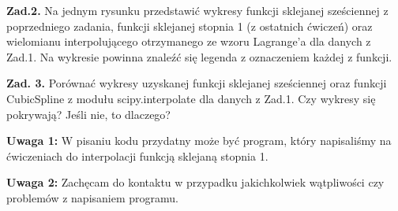 \documentclass[12pt]{report}
\begin{document}
\vspace{3mm}
\noindent
{\bf Zad.2.} Na jednym rysunku przedstawi\'c wykresy funkcji sklejanej sze\'sciennej z poprzedniego zadania, funkcji sklejanej stopnia 1 (z ostatnich \'cwicze\'n) oraz wielomianu interpoluj\k{a}cego otrzymanego ze wzoru Lagrange'a dla danych z Zad.1. Na wykresie powinna znale\'z\'c si\k{e} legenda z oznaczeniem ka\.zdej z funkcji. 

\vspace{3mm}
\noindent
{\bf Zad. 3.} Por\'owna\'c wykresy uzyskanej funkcji sklejanej sze\'sciennej oraz funkcji CubicSpline z modu\l{}u scipy.interpolate dla danych z Zad.1. Czy wykresy si\k{e} pokrywaj\k{a}? Je\'sli nie, to dlaczego?

\vspace{3mm}
\noindent
{\bf Uwaga 1:} W pisaniu kodu przydatny mo\.ze by\'c program, kt\'ory napisali\'smy na \'cwiczeniach do interpolacji funkcj\k{a} sklejan\k{a} stopnia 1.

\noindent
{\bf Uwaga 2:} Zach\k{e}cam do kontaktu w przypadku jakichkolwiek w\k{a}tpliwo\'sci czy problem\'ow z napisaniem programu.
\end{document}
